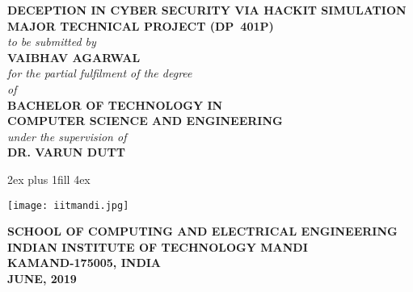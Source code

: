 \thispagestyle{empty}
\setcounter{page}{0}
\vglue 0in
\begin{center}
	{\Large{\bf DECEPTION IN CYBER SECURITY VIA HACKIT SIMULATION}}\\[5ex]
	{\large{\bf MAJOR TECHNICAL PROJECT (DP~401P)}}\\[2ex]
	{\normalsize \em to be submitted by}\\[2ex]
	{\large{\bf VAIBHAV AGARWAL}}\\[2ex]
	{\normalsize \em for the partial fulfilment of the degree}\\
	{\normalsize \em of}\\[2ex]
	{\large{\bf BACHELOR OF TECHNOLOGY IN}}\\
	{\large{\bf COMPUTER SCIENCE AND ENGINEERING}}\\[2ex]
	
	{\em under the supervision of}\\
	{\large {\bf  DR. VARUN DUTT}}
\end{center}

\vglue 2ex plus 1fill  %
\vglue 4ex
\centerline{\texttt{[image: iitmandi.jpg]}}%

\begin{center}
	{\normalsize \bf SCHOOL OF COMPUTING AND ELECTRICAL ENGINEERING}\\[1ex]
	{\large \bf INDIAN INSTITUTE OF TECHNOLOGY MANDI}\\[1ex]
	{\large \bf KAMAND-175005, INDIA}\\[1ex]
	{\bf JUNE, 2019}
\end{center}

\clearpage
\thispagestyle{empty}
~\clearpage


